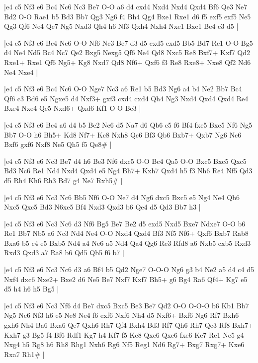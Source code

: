 \whitename{}
\blackname{}
\makegametitle
|e4 c5 Nf3 e6 Bc4 Nc6 Nc3 Be7 O-O a6 d4 cxd4 Nxd4 Nxd4 Qxd4 Bf6 Qe3 Ne7 Bd2 O-O Rae1 b5 Bd3 Bb7 Qg3 Ng6 f4 Bh4 Qg4 Bxe1 Rxe1 d6 f5 exf5 exf5 Ne5 Qg3 Qf6 Ne4 Qe7 Ng5 Nxd3 Qh4 h6 Nf3 Qxh4 Nxh4 Nxe1 Bxe1 Be4 c3 d5  |

\whitename{}
\blackname{}
\makegametitle
|e4 c5 Nf3 e6 Bc4 Nc6 O-O Nf6 Nc3 Be7 d3 d5 exd5 exd5 Bb5 Bd7 Re1 O-O Bg5 d4 Ne4 Nd5 Bc4 Nc7 Qe2 Bxg5 Nexg5 Qf6 Ne4 Qd8 Nxc5 Re8 Bxf7+ Kxf7 Qd2 Rxe1+ Rxe1 Qf6 Ng5+ Kg8 Nxd7 Qd8 Nf6+ Qxf6 f3 Re8 Rxe8+ Nxe8 Qf2 Nd6 Ne4 Nxe4  |

\whitename{}
\blackname{}
\makegametitle
|e4 c5 Nf3 e6 Bc4 Nc6 O-O Nge7 Nc3 a6 Re1 b5 Bd3 Ng6 a4 b4 Ne2 Bb7 Bc4 Qf6 c3 Bd6 e5 Ngxe5 d4 Nxf3+ gxf3 cxd4 cxd4 Qh4 Ng3 Nxd4 Qxd4 Qxd4 Re4 Bxe4 Nxe4 Qe5 Nxd6+ Qxd6 Kf1 O-O Be3  |

\whitename{}
\blackname{}
\makegametitle
|e4 c5 Nf3 e6 Bc4 a6 d4 b5 Be2 Nc6 d5 Na7 d6 Qb6 e5 f6 Bf4 fxe5 Bxe5 Nf6 Ng5 Bb7 O-O h6 Bh5+ Kd8 Nf7+ Kc8 Nxh8 Qc6 Bf3 Qb6 Bxb7+ Qxb7 Ng6 Nc6 Bxf6 gxf6 Nxf8 Ne5 Qh5 f5 Qe8\#  |

\whitename{}
\blackname{}
\makegametitle
|e4 c5 Nf3 e6 Nc3 Be7 d4 h6 Be3 Nf6 dxc5 O-O Bc4 Qa5 O-O Bxc5 Bxc5 Qxc5 Bd3 Nc6 Re1 Nd4 Nxd4 Qxd4 e5 Ng4 Bh7+ Kxh7 Qxd4 h5 f3 Nh6 Re4 Nf5 Qd3 d5 Rh4 Kh6 Rh3 Bd7 g4 Ne7 Rxh5\#  |

\whitename{}
\blackname{}
\makegametitle
|e4 c5 Nf3 e6 Nc3 Nc6 Bb5 Nf6 O-O Ne7 d4 Ng6 dxc5 Bxc5 e5 Ng4 Ne4 Qb6 Nxc5 Qxc5 Bd3 N6xe5 Bf4 Nxd3 Qxd3 b6 Qe4 d5 Qd3 Bb7 h3  |

\whitename{}
\blackname{}
\makegametitle
|e4 c5 Nf3 e6 Nc3 Nc6 d3 Nf6 Bg5 Be7 Be2 d5 exd5 Nxd5 Bxe7 Ndxe7 O-O b6 Re1 Bb7 Nb5 a6 Nc3 Nd4 Ne4 O-O Nxd4 Qxd4 Bf3 Nf5 Nf6+ Qxf6 Bxb7 Rab8 Bxa6 b5 c4 e5 Bxb5 Nd4 a4 Ne6 a5 Nd4 Qa4 Qg6 Re3 Rfd8 a6 Nxb5 cxb5 Rxd3 Rxd3 Qxd3 a7 Ra8 b6 Qd5 Qb5 f6 b7  |

\whitename{}
\blackname{}
\makegametitle
|e4 c5 Nf3 e6 Nc3 Nc6 d3 a6 Bf4 b5 Qd2 Nge7 O-O-O Ng6 g3 b4 Ne2 a5 d4 c4 d5 Nxf4 dxc6 Nxe2+ Bxe2 d6 Ne5 Be7 Nxf7 Kxf7 Bh5+ g6 Bg4 Ra6 Qf4+ Kg7 e5 d5 h4 h6 h5 Bg5  |

\whitename{}
\blackname{}
\makegametitle
|e4 c5 Nf3 e6 Nc3 Nf6 d4 Be7 dxc5 Bxc5 Be3 Be7 Qd2 O-O O-O-O b6 Kb1 Bb7 Ng5 Nc6 Nf3 h6 e5 Ne8 Ne4 f6 exf6 Nxf6 Nh4 d5 Nxf6+ Bxf6 Ng6 Rf7 Bxh6 gxh6 Nh4 Ba6 Bxa6 Qe7 Qxh6 Rh7 Qf4 Bxh4 Bd3 Rf7 Qh6 Rh7 Qe3 Rf8 Bxh7+ Kxh7 g3 Bg5 f4 Bf6 Rdf1 Kg7 h4 Kf7 f5 Ke8 Qxe6 Qxe6 fxe6 Ke7 Re1 Ne5 g4 Nxg4 h5 Rg8 h6 Rh8 Rhg1 Nxh6 Rg6 Nf5 Reg1 Nd6 Rg7+ Bxg7 Rxg7+ Kxe6 Rxa7 Rh1\#  |

